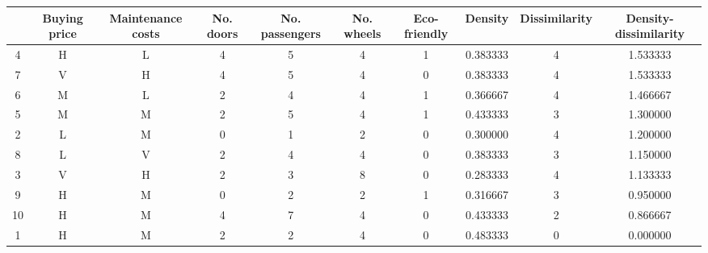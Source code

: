 \begin{tabular}{cccccccccc}
\toprule
{} & Buying price & Maintenance costs &  No. doors &  No. passengers &  No. wheels &  Eco-friendly &   Density &  Dissimilarity &  Density-dissimilarity \\
\midrule
4  &            H &                 L &          4 &               5 &           4 &             1 &  0.383333 &              4 &               1.533333 \\
7  &            V &                 H &          4 &               5 &           4 &             0 &  0.383333 &              4 &               1.533333 \\
6  &            M &                 L &          2 &               4 &           4 &             1 &  0.366667 &              4 &               1.466667 \\
5  &            M &                 M &          2 &               5 &           4 &             1 &  0.433333 &              3 &               1.300000 \\
2  &            L &                 M &          0 &               1 &           2 &             0 &  0.300000 &              4 &               1.200000 \\
8  &            L &                 V &          2 &               4 &           4 &             0 &  0.383333 &              3 &               1.150000 \\
3  &            V &                 H &          2 &               3 &           8 &             0 &  0.283333 &              4 &               1.133333 \\
9  &            H &                 M &          0 &               2 &           2 &             1 &  0.316667 &              3 &               0.950000 \\
10 &            H &                 M &          4 &               7 &           4 &             0 &  0.433333 &              2 &               0.866667 \\
1  &            H &                 M &          2 &               2 &           4 &             0 &  0.483333 &              0 &               0.000000 \\
\bottomrule
\end{tabular}
